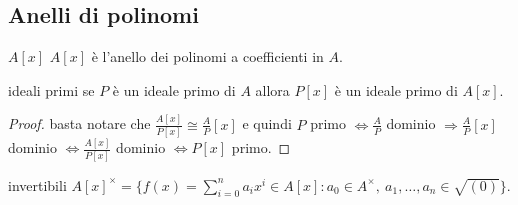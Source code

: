 \subsection{Anelli di polinomi}

\begin{definition}{$A[x]$}
    $A[x]$ è l'anello dei polinomi a coefficienti in $A$.
\end{definition}

\begin{proposition}{ideali primi}
    se $P$ è un ideale primo di $A$ allora $P[x]$ è un ideale primo di $A[x]$. 
\end{proposition}
\begin{proof}
    basta notare che $\frac{A[x]}{P[x]} \cong \frac{A}{P}[x]$ e quindi $P$ primo $\iff \frac{A}{P}$ dominio $\Rightarrow \frac{A}{P}[x]$ dominio $\iff \frac{A[x]}{P[x]}$ dominio $\iff P[x]$ primo.
\end{proof}
\begin{proposition}{invertibili}
    $A[x]^\times = \{f(x) = \sum_{i= 0}^n a_ix^i \in A[x] : a_0 \in A^\times, \ a_1,\dots,a_n \in \sqrt{(0)} \}$.
\end{proposition}
